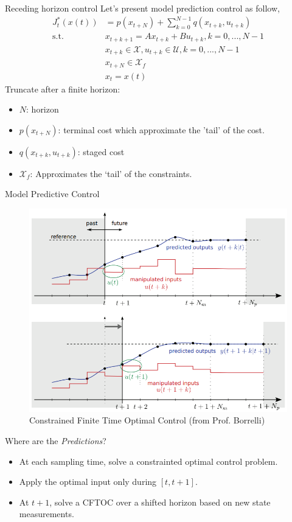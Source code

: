 \documentclass{beamer}
\begin{document}
\begin{frame}{Receding horizon control}
	Let's present model prediction control as follow,
	\begin{align*}
		J_t^*(x(t)) &= p(x_{t+N}) + \sum_{k = 0}^{N-1} q(x_{t+k}, u_{t+k}) \\
		\text{s.t.} & x_{t+k+1} = A x_{t+k} + B u_{t+k}, k = 0,...,N-1 \\
		& x_{t+k} \in \mathcal{X}, u_{t+k} \in \mathcal{U}, k = 0,...,N-1 \\
		& x_{t+N} \in \mathcal{X}_f \\
		& x_t = x(t)
	\end{align*}
	Truncate after a finite horizon:
	\begin{itemize}
		\item $N$: horizon
		\item $p(x_{t+N})$: terminal cost which approximate the 'tail' of the cost.
		\item $q(x_{t+k}, u_{t+k})$: staged cost
		\item $\mathcal{X}_f$: Approximates the ‘tail’ of the constraints.
	\end{itemize}
\end{frame}

\begin{frame}{Model Predictive Control}
	\begin{figure}
		\includegraphics[width=0.5\linewidth]{figures/mpc-prediction.png}
		\caption{Constrained Finite Time Optimal Control (from Prof. Borrelli)}
	\end{figure}
	Where are the \emph{Predictions}?
	\begin{itemize}
		\item At each sampling time, solve a constrainted optimal control problem.
		\item Apply the optimal input only during $[t, t+1]$.
		\item At $t + 1$, solve a CFTOC over a shifted horizon based on new state measurements.
	\end{itemize}
\end{frame}
\end{document}
